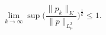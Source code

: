 \documentclass[tikz]{standalone}
\begin{document}
$$
\lim_{k \rightarrow \infty} \sup \biggl(\frac{\parallel p_k \parallel_K}{\parallel p \parallel_{L_{\mu}^2}}\biggr)^{\frac{1}{k}} \leq 1.
$$
\end{document}
